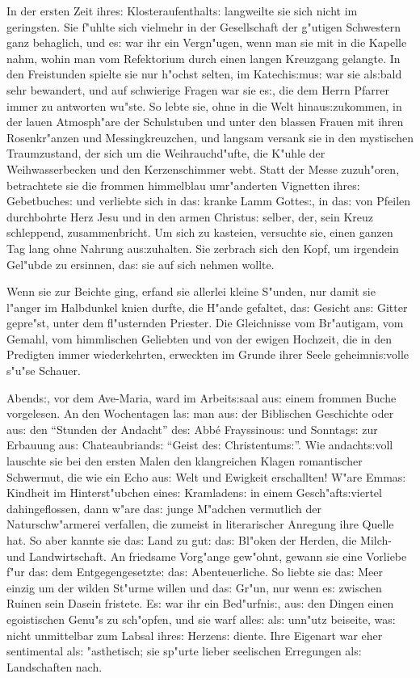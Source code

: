 \documentclass[oneside,12pt]{book}
\newcommand{\s}{s:}%
\begin{document}
In der ersten Zeit ihre{\s} Klosteraufenthalt{\s} langweilte sie
sich nicht im geringsten. Sie f"uhlte sich vielmehr in der
Gesellschaft der g"utigen Schwestern ganz behaglich, und e{\s} war
ihr ein Vergn"ugen, wenn man sie mit in die Kapelle nahm, wohin
man vom Refektorium durch einen langen Kreuzgang gelangte. In den
Freistunden spielte sie nur h"ochst selten, im Katechi{\s}mu{\s}
war sie al{\s}bald sehr bewandert, und auf schwierige Fragen war
sie e{\s}, die dem Herrn Pfarrer immer zu antworten wu"ste. So
lebte sie, ohne in die Welt hinau{\s}zukommen, in der lauen
Atmosph"are der Schulstuben und unter den blassen Frauen mit ihren
Rosenkr"anzen und Messingkreuzchen, und langsam versank sie in den
mystischen Traumzustand, der sich um die Weihrauchd"ufte, die
K"uhle der Weihwasserbecken und den Kerzenschimmer webt. Statt der
Messe zuzuh"oren, betrachtete sie die frommen himmelblau
umr"anderten Vignetten ihre{\s} Gebetbuche{\s} und verliebte sich
in da{\s} kranke Lamm Gotte{\s}, in da{\s} von Pfeilen durchbohrte
Herz Jesu und in den armen Christu{\s} selber, der, sein Kreuz
schleppend, zusammenbricht. Um sich zu kasteien, versuchte sie,
einen ganzen Tag lang ohne Nahrung au{\s}zuhalten. Sie zerbrach
sich den Kopf, um irgendein Gel"ubde zu ersinnen, da{\s} sie auf
sich nehmen wollte.

Wenn sie zur Beichte ging, erfand sie allerlei kleine S"unden, nur
damit sie l"anger im Halbdunkel knien durfte, die H"ande gefaltet,
da{\s} Gesicht an{\s} Gitter gepre"st, unter dem fl"usternden
Priester. Die Gleichnisse vom Br"autigam, vom Gemahl, vom
himmlischen Geliebten und von der ewigen Hochzeit, die in den
Predigten immer wiederkehrten, erweckten im Grunde ihrer Seele
geheimni{\s}volle s"u"se Schauer.

Abend{\s}, vor dem Ave-Maria, ward im Arbeit{\s}saal au{\s} einem
frommen Buche vorgelesen. An den Wochentagen la{\s} man au{\s} der
Biblischen Geschichte oder au{\s} den "`Stunden der Andacht"'
de{\s} Abb\'e Frayssinou{\s} und Sonntag{\s} zur Erbauung au{\s}
Chateaubriand{\s} "`Geist de{\s} Christentum{\s}"'. Wie
andacht{\s}voll lauschte sie bei den ersten Malen den klangreichen
Klagen romantischer Schwermut, die wie ein Echo au{\s} Welt und
Ewigkeit erschallten! W"are Emma{\s} Kindheit im Hinterst"ubchen
eine{\s} Kramladen{\s} in einem Gesch"aft{\s}viertel
dahingeflossen, dann w"are da{\s} junge M"adchen vermutlich der
Naturschw"armerei verfallen, die zumeist in literarischer Anregung
ihre Quelle hat. So aber kannte sie da{\s} Land zu gut: da{\s}
Bl"oken der Herden, die Milch- und Landwirtschaft. An friedsame
Vorg"ange gew"ohnt, gewann sie eine Vorliebe f"ur da{\s} dem
Entgegengesetzte: da{\s} Abenteuerliche. So liebte sie da{\s} Meer
einzig um der wilden St"urme willen und da{\s} Gr"un, nur wenn
e{\s} zwischen Ruinen sein Dasein fristete. E{\s} war ihr ein
Bed"urfni{\s}, au{\s} den Dingen einen egoistischen Genu"s zu
sch"opfen, und sie warf alle{\s} al{\s} unn"utz beiseite, wa{\s}
nicht unmittelbar zum Labsal ihre{\s} Herzen{\s} diente. Ihre
Eigenart war eher sentimental al{\s} "asthetisch; sie sp"urte
lieber seelischen Erregungen al{\s} Landschaften nach.
\end{document}
